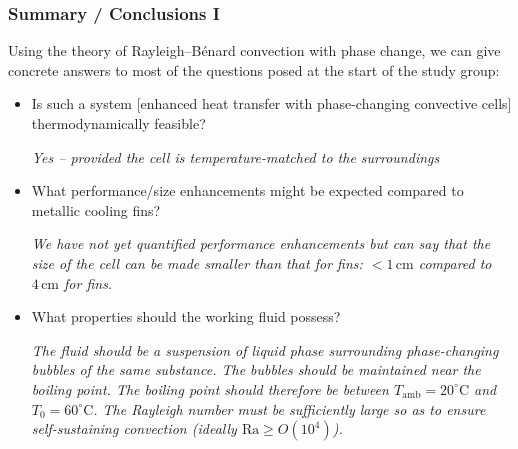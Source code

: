 \documentclass[10pt,mathserif]{beamer}
\newcommand{\myra}{\mathrm{Ra}}
\newcommand{\Tamb}{T_{\mathrm{amb}}}
\begin{document}
\begin{frame}
\frametitle{Summary / Conclusions I}
Using the theory of Rayleigh--B\'enard convection with phase change, we can give concrete answers to most of the questions posed at the start of the study group:
%
%
\begin{itemize}[<+>]
\item {Is such a system [enhanced heat transfer with phase-changing convective cells] thermodynamically  feasible?

{\emph{Yes -- provided the cell is temperature-matched to the surroundings}}
}

\item {What performance/size enhancements might be expected compared
to metallic cooling fins?

{\emph{We have not yet quantified performance enhancements but can say that the size of the cell can be made smaller than that for fins: $<1\,\mathrm{cm}$ compared to $4\,\mathrm{cm}$ for fins.}}
}

\item{ What properties should the working fluid possess?

{\emph{The fluid should be a suspension of liquid phase surrounding phase-changing bubbles of the same substance.  The bubbles should be maintained near the boiling point.  The boiling point should therefore be between $\Tamb=20^\circ\mathrm{C}$ and $T_0=60^\circ\mathrm{C}$.  The Rayleigh number must be sufficiently large so as to ensure self-sustaining convection (ideally $\myra\geq O(10^4)$).}}
}



\end{itemize}
\end{frame}
\end{document}
